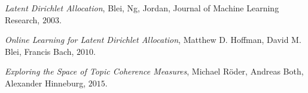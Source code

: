 \begin{thebibliography}{99}
	\textit{Latent Dirichlet Allocation}, Blei, Ng, Jordan, Journal of Machine Learning Research, $2003$.
	
	\textit{Online Learning for Latent Dirichlet Allocation}, Matthew D. Hoffman, David M. Blei, Francis Bach, $2010$.
	
	
	\textit{Exploring the Space of Topic Coherence Measures}, Michael Röder, Andreas Both, Alexander Hinneburg, $2015$.
\end{thebibliography}